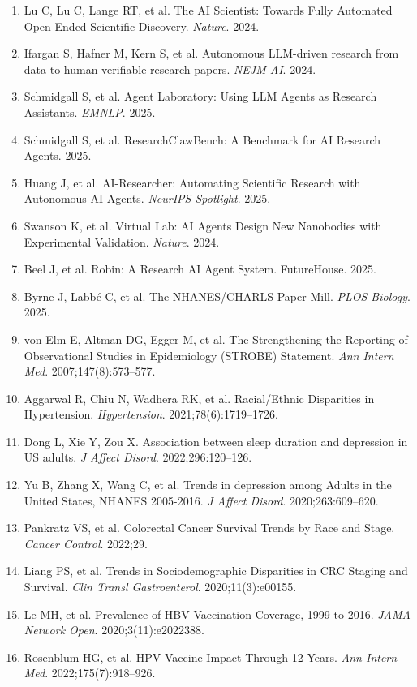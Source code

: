 \documentclass[12pt]{article}
\begin{document}
\begin{enumerate}
\item Lu C, Lu C, Lange RT, et al. The AI Scientist: Towards Fully Automated Open-Ended Scientific Discovery. \textit{Nature}. 2024.
\item Ifargan S, Hafner M, Kern S, et al. Autonomous LLM-driven research from data to human-verifiable research papers. \textit{NEJM AI}. 2024.
\item Schmidgall S, et al. Agent Laboratory: Using LLM Agents as Research Assistants. \textit{EMNLP}. 2025.
\item Schmidgall S, et al. ResearchClawBench: A Benchmark for AI Research Agents. 2025.
\item Huang J, et al. AI-Researcher: Automating Scientific Research with Autonomous AI Agents. \textit{NeurIPS Spotlight}. 2025.
\item Swanson K, et al. Virtual Lab: AI Agents Design New Nanobodies with Experimental Validation. \textit{Nature}. 2024.
\item Beel J, et al. Robin: A Research AI Agent System. FutureHouse. 2025.
\item Byrne J, Labb\'{e} C, et al. The NHANES/CHARLS Paper Mill. \textit{PLOS Biology}. 2025.
\item von Elm E, Altman DG, Egger M, et al. The Strengthening the Reporting of Observational Studies in Epidemiology (STROBE) Statement. \textit{Ann Intern Med}. 2007;147(8):573--577.
\item Aggarwal R, Chiu N, Wadhera RK, et al. Racial/Ethnic Disparities in Hypertension. \textit{Hypertension}. 2021;78(6):1719--1726.
\item Dong L, Xie Y, Zou X. Association between sleep duration and depression in US adults. \textit{J Affect Disord}. 2022;296:120--126.
\item Yu B, Zhang X, Wang C, et al. Trends in depression among Adults in the United States, NHANES 2005-2016. \textit{J Affect Disord}. 2020;263:609--620.
\item Pankratz VS, et al. Colorectal Cancer Survival Trends by Race and Stage. \textit{Cancer Control}. 2022;29.
\item Liang PS, et al. Trends in Sociodemographic Disparities in CRC Staging and Survival. \textit{Clin Transl Gastroenterol}. 2020;11(3):e00155.
\item Le MH, et al. Prevalence of HBV Vaccination Coverage, 1999 to 2016. \textit{JAMA Network Open}. 2020;3(11):e2022388.
\item Rosenblum HG, et al. HPV Vaccine Impact Through 12 Years. \textit{Ann Intern Med}. 2022;175(7):918--926.

\end{enumerate}
\end{document}
